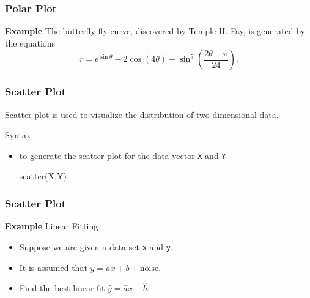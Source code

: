\documentclass[compress]{beamer}  %
\begin{document}
\begin{frame}[fragile]
\frametitle{Polar Plot}
\textbf{Example} 
The butterfly fly curve, discovered by Temple H. Fay, is generated by the equations
\begin{equation}
r=e^{\sin \theta} - 2 \cos (4 \theta ) + \sin^5\left(\frac{2 \theta - \pi}{24}\right).
\end{equation}\pause

\setcounter{subfigure}{0}
\begin{figure}
    \centering
\end{figure}

\end{frame}
\begin{frame}[fragile]
\frametitle{Scatter Plot}
Scatter plot is used to visualize the distribution of two dimensional data.

\begin{block}{Syntax}
\begin{itemize}
    \item to generate the scatter plot for the data vector \texttt{X} and \texttt{Y}
          \begin{matlabcodebeamer}[numbers=none,frame=none,backgroundcolor=\color{blockbody}]
          scatter(X,Y)
          \end{matlabcodebeamer}
\end{itemize}
\end{block}


\end{frame}
\begin{frame}[fragile]
\frametitle{Scatter Plot}
\textbf{Example} Linear Fitting

\begin{itemize}[<+->]
    \item Suppose we are given a data set \texttt{x} and \texttt{y}.
    \item It is assumed that $y = ax + b + \mbox{noise}$.
    \item Find the best linear fit $\hat{y} = \hat{a} x + \hat{b}$.
\end{itemize}
\pause
\setcounter{subfigure}{0}
\begin{figure}
    \centering
\end{figure}

\end{frame}
\end{document}
